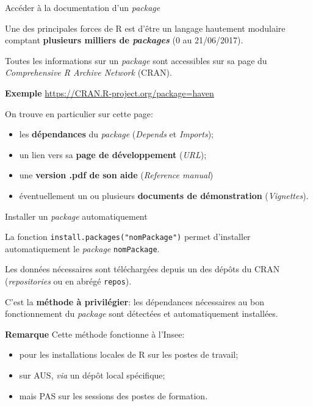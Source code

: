 \documentclass[12pt,handout,ignorenonframetext,]{beamer}
\providecommand{\tightlist}{%
\setlength{\itemsep}{0pt}\setlength{\parskip}{0pt}}
\begin{document}
\begin{frame}{Accéder à la documentation d'un \emph{package}}

Une des principales forces de R est d'être un langage hautement
modulaire comptant \textbf{plusieurs milliers de \emph{packages}} (0 au
21/06/2017).

\pause Toutes les informations sur un \emph{package} sont accessibles
sur sa page du \emph{Comprehensive R Archive Network} (CRAN).

\textbf{Exemple} \url{https://CRAN.R-project.org/package=haven}

\pause \bigskip On trouve en particulier sur cette page:

\begin{itemize}
\tightlist
\item
  les \textbf{dépendances} du \emph{package} (\emph{Depends} et
  \emph{Imports});
\item
  un lien vers sa \textbf{page de développement} (\emph{URL});
\item
  une \textbf{version .pdf de son aide} (\emph{Reference manual})
\item
  éventuellement un ou plusieurs \textbf{documents de démonstration}
  (\emph{Vignettes}).
\end{itemize}

\end{frame}

\begin{frame}[fragile]{Installer un \emph{package} automatiquement}

La fonction \texttt{install.packages("nomPackage")} permet d'installer
automatiquement le \emph{package} \texttt{nomPackage}.

Les données nécessaires sont téléchargées depuis un des dépôts du CRAN
(\emph{repositories} ou en abrégé \texttt{repos}).

C'est la \textbf{méthode à privilégier}: les dépendances nécessaires au
bon fonctionnement du \emph{package} sont détectées et automatiquement
installées.

\pause 

\textbf{Remarque} Cette méthode fonctionne à l'Insee:

\begin{itemize}
\tightlist
\item
  pour les installations locales de R sur les postes de travail;
\item
  sur AUS, \emph{via} un dépôt local spécifique;
\item
  mais PAS sur les sessions des postes de formation.
\end{itemize}

\end{frame}
\end{document}
